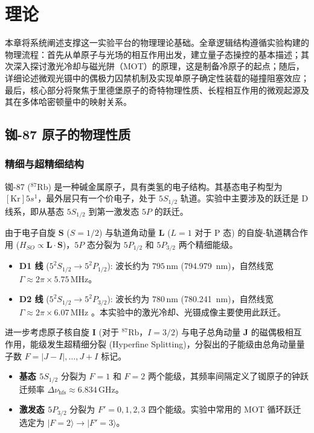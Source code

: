 \documentclass[../main.tex]{subfiles}
\begin{document}
\chapter{理论}
\label{ch1:sec:theory}
本章将系统阐述支撑这一实验平台的物理理论基础。全章逻辑结构遵循实验构建的物理流程：首先从单原子与光场的相互作用出发，建立量子态操控的基本描述；其次深入探讨激光冷却与磁光阱（MOT）的原理，这是制备冷原子的起点；随后，详细论述微观光镊中的偶极力囚禁机制及实现单原子确定性装载的碰撞阻塞效应；最后，核心部分将聚焦于里德堡原子的奇特物理性质、长程相互作用的微观起源及其在多体哈密顿量中的映射关系。

\section{铷-87 原子的物理性质}
\subsection{精细与超精细结构}
铷-87 ($^{87}\text{Rb}$) 是一种碱金属原子，具有类氢的电子结构。其基态电子构型为 $[\text{Kr}]5s^1$，最外层只有一个价电子，处于 $5S_{1/2}$ 轨道。实验中主要涉及的跃迁是 D 线系，即从基态 $5S_{1/2}$ 到第一激发态 $5P$ 的跃迁。

由于电子自旋 $\mathbf{S}$ ($S=1/2$) 与轨道角动量 $\mathbf{L}$ ($L=1$ 对于 P 态) 的自旋-轨道耦合作用 ($H_{SO} \propto \mathbf{L}\cdot\mathbf{S}$)，$5P$ 态分裂为 $5P_{1/2}$ 和 $5P_{3/2}$ 两个精细能级。
\begin{itemize}
    \item \textbf{D1 线} ($5^2S_{1/2} \rightarrow 5^2P_{1/2}$): 波长约为 $795\,\text{nm}$ (\SI{794.979}{\nm})，自然线宽 $\Gamma \approx 2\pi \times 5.75\,\text{MHz}$。
    \item \textbf{D2 线} ($5^2S_{1/2} \rightarrow 5^2P_{3/2}$): 波长约为 $780\,\text{nm}$ (\SI{780.241}{\nm})，自然线宽 $\Gamma \approx 2\pi \times 6.07\,\text{MHz}$ 。本实验中的激光冷却、光镊成像主要使用此跃迁。
\end{itemize}

进一步考虑原子核自旋 $\mathbf{I}$ (对于 $^{87}\text{Rb}$，$I=3/2$) 与电子总角动量 $\mathbf{J}$ 的磁偶极相互作用，能级发生超精细分裂 (Hyperfine Splitting)，分裂出的子能级由总角动量量子数 $F = |J-I|, \dots, J+I$ 标记。
\begin{itemize}
    \item \textbf{基态 $5S_{1/2}$} 分裂为 $F=1$ 和 $F=2$ 两个能级，其频率间隔定义了铷原子的钟跃迁频率 $\Delta \nu_{\text{hfs}} \approx 6.834\,\text{GHz}$。
    \item \textbf{激发态 $5P_{3/2}$} 分裂为 $F'=0, 1, 2, 3$ 四个能级。实验中常用的 MOT 循环跃迁选定为 $|F=2\rangle \rightarrow |F'=3\rangle$。
\end{itemize}
\end{document}
